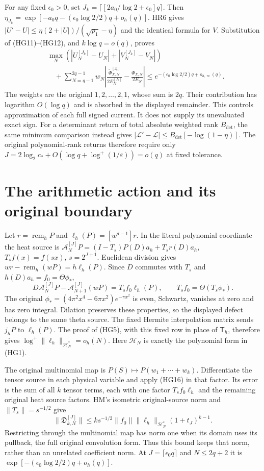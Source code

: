 For any fixed $\epsilon_0>0$, set
$J_k=\lceil[2a_0/\log2+\epsilon_0]q\rceil$.
Then $\eta_{J_k}=\exp[-a_0q-(\epsilon_0\log2/2)q+o_h(q)]$.
HR6 gives
$|U'-U|\le\eta(2+|U|)/(\sqrt{p_1}-\eta)$ and the identical
formula for $V$. Substitution of (HG11)--(HG12), and $k\log q=o(q)$,
proves
\[
 \begin{aligned}
 &\max_N(|U_N^{[J_k]}-U_N|+|V_N^{[J_k]}-V_N|)\\
 &\quad+\sum_{N=q-1}^{2q-1}w_N
 \left|\frac{\widetilde\Phi_{X,N}^{[J_k]}}{2E_N^{[J_k]}}
                  -\frac{\Phi_{X,N}}{2E_N}\right|
 \le e^{-(\epsilon_0\log2/2)q+o_{h,\varpi}(q)} .
 \end{aligned}\tag{HG15}
\]
The weights are the original $1,2,\ldots,2,1$, whose sum is $2q$.
Their contribution has logarithm $O(\log q)$ and is absorbed in the
displayed remainder. This controls approximation of each full signed
current. It does not supply its unevaluated exact sign.
For a determinant return of total absolute weighted rank $B_{\det}$,
the same minimum comparison instead gives
$|\mathcal L'-\mathcal L|\le B_{\det}[-\log(1-\eta)]$.
The original polynomial-rank returns therefore require only
$J=2\log_2c_*+O(\log q+\log^+(1/\varepsilon))=o(q)$ at fixed tolerance.

\section{The arithmetic action and its original boundary}
Let $r=\operatorname{rem}_hP$ and
$\ell_h(P)=[w^{d-1}]r$. In the literal polynomial coordinate the
heat source is
$\mathcal A_N^{[J]}P=(I-T_s)P(D)a_h+T_sr(D)a_h$,
$T_sf(x)=f(sx)$, $s=2^{J+1}$.
Euclidean division gives
$wr-\operatorname{rem}_h(wP)=h\ell_h(P)$.
Since $D$ commutes with $T_s$ and $h(D)a_h=f_0=\Theta\phi_*$,
\[
 D\mathcal A_N^{[J]}P-\mathcal A_{N+1}^{[J]}(wP)
             =T_sf_0\ell_h(P),\qquad T_sf_0=\Theta(T_s\phi_*).
 \tag{HG16}
\]
The original $\phi_*=(4\pi^2x^4-6\pi x^2)e^{-\pi x^2}$ is even,
Schwartz, vanishes at zero and has zero integral. Dilation preserves
these properties, so the displayed defect belongs to the same theta
source. The fixed Hermite interpolation matrix sends $j_hP$ to
$\ell_h(P)$. The proof of (HG5), with this fixed row in place of
$\mathsf T_h$, therefore gives
$\log^+\|\ell_h\|_{\mathcal H_N^*}=o_h(N)$.
Here $\mathcal H_N$ is exactly the polynomial form in (HG1).

The original multinomial map is
$P(S)\mapsto P(w_1+\cdots+w_k)$. Differentiate the tensor source
in each physical variable and apply (HG16) in that factor.
Its error is the sum of all $k$ tensor terms, each with one factor
$T_sf_0\ell_h$ and the remaining original heat source factors.
HM's isometric original-source norm and $\|T_s\|=s^{-1/2}$ give
\[
 \|\mathfrak D_{k,N}^{[J]}\|
 \le k s^{-1/2}\|f_0\|\|\ell_h\|_{\mathcal H_N^*}
                  (1+t_J)^{k-1}.\tag{HG17}
\]
Restricting through the multinomial map has norm one when its domain
uses its pullback, the full original convolution form. Thus this
bound keeps that norm, rather than an unrelated coefficient norm.
At $J=\lceil\epsilon_0q\rceil$ and $N\le2q+2$ it is
$\exp[-(\epsilon_0\log2/2)q+o_h(q)]$.

